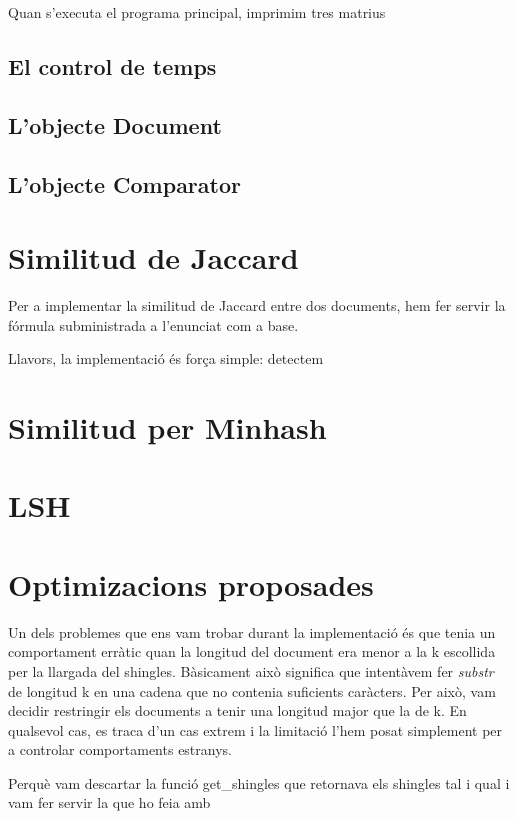 \documentclass[catalan, 12pt]{report}
\begin{document}
Quan s'executa el programa principal, imprimim tres matrius

\subsection{El control de temps}

\subsection{L'objecte Document}

\subsection{L'objecte Comparator}


\section{Similitud de Jaccard}

Per a implementar la similitud de Jaccard entre dos documents, hem fer servir la fórmula subministrada a l'enunciat com a base.

Llavors, la implementació és força simple: detectem

\section{Similitud per Minhash}

\section{LSH}

\section{Optimizacions proposades}

Un dels problemes que ens vam trobar durant la implementació és que tenia un comportament erràtic quan la longitud del document era menor a la k escollida per la llargada del shingles. Bàsicament això significa que intentàvem fer \textit{substr} de longitud k en una cadena que no contenia suficients caràcters. Per això, vam decidir restringir els documents a tenir una longitud major que la de k. En qualsevol cas, es traca d'un cas extrem i la limitació l'hem posat simplement per a controlar comportaments estranys.

Perquè vam descartar la funció get\_shingles que retornava els shingles tal i qual i vam fer servir la que ho feia amb
\end{document}
